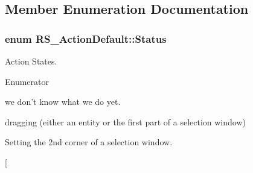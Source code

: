 \subsection{Member Enumeration Documentation}
\hypertarget{classRS__ActionDefault_ad26a7fa3d02107a86e4ad44276ee8e1c}{
\subsubsection[{Status}]{\setlength{\rightskip}{0pt plus 5cm}enum {\bf R\-S\-\_\-\-Action\-Default\-::\-Status}}}\label{classRS__ActionDefault_ad26a7fa3d02107a86e4ad44276ee8e1c}
Action States. \begin{Desc}
\item[Enumerator]\par
\begin{description}
\item[{\em 
\hypertarget{classRS__ActionDefault_ad26a7fa3d02107a86e4ad44276ee8e1caecf914a039f05d75196e949386822851}{Neutral}\label{classRS__ActionDefault_ad26a7fa3d02107a86e4ad44276ee8e1caecf914a039f05d75196e949386822851}
}]we don't know what we do yet. \item[{\em 
\hypertarget{classRS__ActionDefault_ad26a7fa3d02107a86e4ad44276ee8e1cab93e25eb8e74629529ef10a2b9e836bf}{Dragging}\label{classRS__ActionDefault_ad26a7fa3d02107a86e4ad44276ee8e1cab93e25eb8e74629529ef10a2b9e836bf}
}]dragging (either an entity or the first part of a selection window) \item[{\em 
\hypertarget{classRS__ActionDefault_ad26a7fa3d02107a86e4ad44276ee8e1ca704410bdbf6fc179e102171a2a677303}{Set\-Corner2}\label{classRS__ActionDefault_ad26a7fa3d02107a86e4ad44276ee8e1ca704410bdbf6fc179e102171a2a677303}
}]Setting the 2nd corner of a selection window. \item[{\em 
}
\end{description}
\end{Desc}
